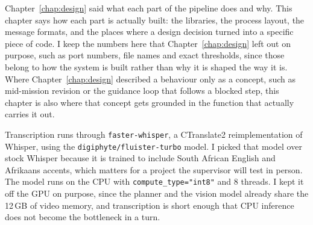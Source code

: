 \label{chap:implementation}


Chapter~\ref{chap:design} said what each part of the pipeline does and why.
This chapter says how each part is actually built: the libraries, the process
layout, the message formats, and the places where a design decision turned
into a specific piece of code. I keep the numbers here that
Chapter~\ref{chap:design} left out on purpose, such as port numbers, file
names and exact thresholds, since those belong to how the system is built
rather than why it is shaped the way it is. Where Chapter~\ref{chap:design}
described a behaviour only as a concept, such as mid-mission revision or the
guidance loop that follows a blocked step, this chapter is also where that
concept gets grounded in the function that actually carries it out.

\label{sec:speech}

\label{sec:stt}

Transcription runs through \texttt{faster-whisper}, a CTranslate2 reimplementation
of Whisper, using the \texttt{digiphyte/\allowbreak fluister-turbo} model. I picked that model
over stock Whisper because it is trained to include South African English and
Afrikaans accents, which matters for a project the supervisor will test in person.
The model runs on the CPU with \texttt{compute\_type="int8"} and 8 threads. I kept
it off the GPU on purpose, since the planner and the vision model already share
the 12\,GB of video memory, and transcription is short enough that CPU inference
does not become the bottleneck in a turn.

